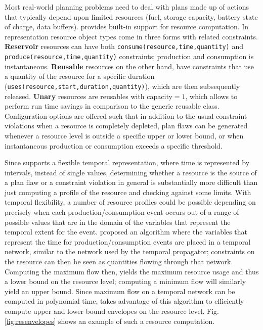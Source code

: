 Most real-world planning problems need to deal with plans made up of
actions that typically depend upon limited resources (\eg fuel,
storage capacity, battery state of charge, data buffers).  \eu
provides built-in support for resource computation. In \eus
representation resource object types come in three forms with related
constraints. \textbf{Reservoir} resources can have both
\texttt{consume(resource,time,quantity)} and
\texttt{produce(resource,time,quantity)} constraints; production and
consumption is instantaneous. \textbf{Reusable} resources on the other
hand, have constraints that use a quantity of the resource for a
specific duration (\texttt{uses(resource,start,duration,quantity)}),
which are then subsequently released. \textbf {Unary} resources are
reusables with capacity$ = 1$, which allows \eu to perform run time
savings in comparison to the generic reusable class. Configuration
options are offered such that in addition to the usual constraint
violations when a resource is completely depleted, plan flaws can be
generated whenever a resource level is outside a specific upper or
lower bound, or when instantaneous production or consumption exceeds a
specific threshold.

Since \eu supports a flexible temporal representation, where time is
represented by intervals, instead of single values, determining
whether a resource is the source of a plan flaw or a constraint
violation in general is substantially more difficult than just
computing a profile of the resource and checking against some limits.
With temporal flexibility, a number of resource profiles could be
possible depending on precisely when each production/consumption event
occurs out of a range of possible values that are in the domain of the
variables that represent the temporal extent for the event.
\cite{Muscettola04,Muscettola06} proposed an algorithm where the
variables that represent the time for production/consumption events
are placed in a temporal network, similar to the network used by the
temporal propagator; constraints on the resource can then be seen as
quantities flowing through that network. Computing the maximum flow
then, yields the maximum resource usage and thus a lower bound on the
resource level; computing a minimum flow will similarly yield an upper
bound. Since maximum flow on a temporal network can be computed in
polynomial time, \eu takes advantage of this algorithm to efficiently
compute upper and lower bound envelopes on the resource
level. Fig. \ref{fig:resenvelopes} shows an example of such a resource
computation.

